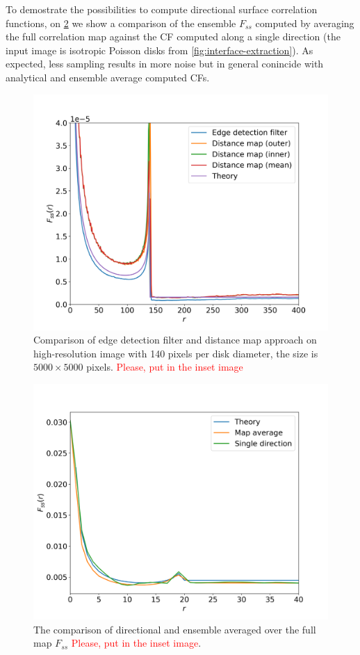 \documentclass[reprint,amsmath,amssymb,aps,pre,showkeys,showpacs]{revtex4-1}
\begin{document}
To demostrate the possibilities to compute directional surface correlation
functions, on \cref{fig:direction-vs-map} we show a comparison of the ensemble
$F_{ss}$ computed by averaging the full correlation map against the CF computed
along a single direction (the input image is isotropic Poisson disks from
\cref{fig:interface-extraction}). As expected, less sampling results in more
noise but in general conincide with analytical and ensemble average computed
CFs.

\begin{figure}[ht]
  \centering
  \includegraphics[width=\linewidth]{images/sobel-vs-distance-map.png}
  \caption{Comparison of edge detection filter and distance map approach on
    high-resolution image with 140 pixels per disk diameter, the size is
    $5000 \times 5000$ pixels. \textcolor{red}{Please, put in the inset image}}
  \label{fig:sobel-vs-distance-map}
\end{figure}

\begin{figure}[ht]
  \centering
  \includegraphics[width=\linewidth]{images/direction_and_map.png}
  \caption{The comparison of directional and ensemble averaged over the full map
    $F_{ss}$ \textcolor{red}{Please, put in the inset image}.}
  \label{fig:direction-vs-map}
\end{figure}
\end{document}
